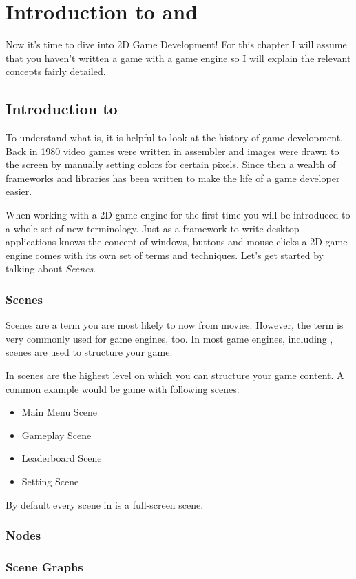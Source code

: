 \chapter{Introduction to \SB{} and \cocos{} }
Now it's time to dive into 2D Game Development! For this chapter I will assume
that you haven't written a game with a game engine so I will explain the
relevant concepts fairly detailed.

\section{Introduction to \cocos{}}
To understand what \cocos{} is, it is helpful to look at the history of game
development. Back in 1980 video games were written in assembler and images were
drawn to the screen by manually setting colors for certain pixels. Since then a
wealth of frameworks and libraries has been written to make the life of a game
developer easier. 

When working with a 2D game engine for the first time you will be introduced to
a whole set of new terminology. Just as a framework to write desktop
applications knows the concept of windows, buttons and mouse clicks a 2D game
engine comes with its own set of terms and techniques. Let's get started by
talking about \textit{Scenes}.
\subsection{Scenes}
Scenes are a term you are most likely to now from movies. However, the term is
very commonly used for game engines, too. In most game engines, including
\cocos{}, scenes are used to structure your game.

In \cocos{} scenes are the highest level on which you can structure your game
content. A common example would be game with following scenes:
\begin{itemize}
  \item Main Menu Scene
  \item Gameplay Scene
  \item Leaderboard Scene
  \item Setting Scene
\end{itemize}
By default every scene in \cocos{} is a full-screen scene. 
\subsection{Nodes}
\subsection{Scene Graphs}

